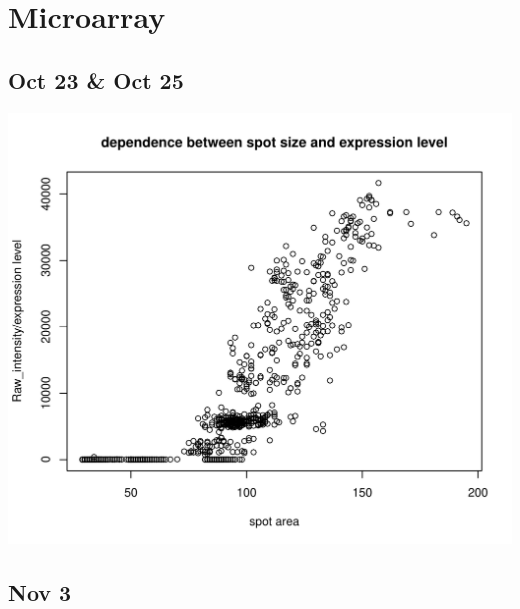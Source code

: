 \documentclass{article}\usepackage[]{graphicx}\usepackage[]{color}
\makeatletter
\def\maxwidth{ %
  \ifdim\Gin@nat@width>\linewidth
    \linewidth
  \else
    \Gin@nat@width
  \fi
}
\makeatother
\begin{document}
\section{Microarray}

  \subsection{Oct 23 \& Oct 25}
\begin{Schunk}


{\centering \includegraphics[width=\maxwidth]{figure/Oct_23_start_micro-1} 

}

\end{Schunk}


  \subsection{Nov 3}
  
\end{document}
